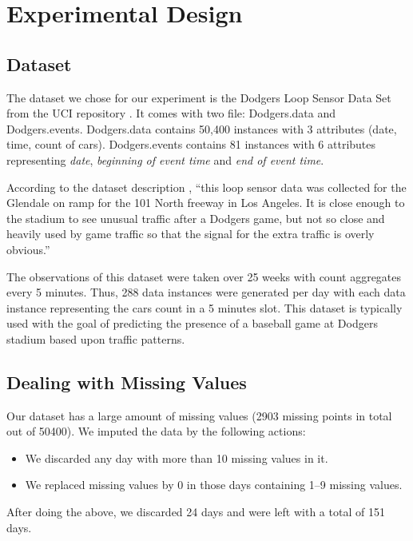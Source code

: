 \documentclass[conference]{IEEEtran}
\begin{document}
		
		\section{Experimental Design}
		\label{sec:experimental-design}
		\subsection{Dataset}
		The dataset we chose for our experiment is the Dodgers Loop Sensor Data Set from the UCI repository \cite{dataset}. It comes with two file: Dodgers.data and Dodgers.events. Dodgers.data contains 50,400 instances with 3 attributes (date, time, count of cars). Dodgers.events contains 81 instances with 6 attributes representing \textit{date}, \textit{beginning of event time} and \textit{end of event time}. 
		
		According to the dataset description \cite{dataset}, ``this loop sensor data was collected for the Glendale on ramp for the 101 North freeway in Los Angeles. It is close enough to the stadium to see unusual traffic after a Dodgers game, but not so close and heavily used by game traffic so that the signal for the extra traffic is overly obvious.'' 
		
		The observations of this dataset were taken over 25 weeks with count aggregates every 5 minutes. Thus, 288 data instances were generated per day with each data instance representing the cars count in a 5 minutes slot. This dataset is typically used with the goal of predicting the presence of a baseball game at Dodgers stadium based upon traffic patterns. 
		
		\subsection{Dealing with Missing Values}
		\label{sec:missing-values}
		
		Our dataset has a large amount of missing values (2903 missing points in total out of 50400). We imputed the data by the following actions:
		\begin{itemize}
			\item We discarded any day with more than 10 missing values in it.
			\item We replaced missing values by 0 in those days containing 1--9 missing values.
		\end{itemize}
		After doing the above, we discarded 24 days and were left with a total of 151 days. 
		
\end{document}
